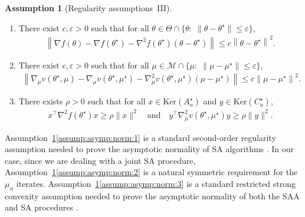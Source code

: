\documentclass[11pt,a4paper]{article}
\theoremstyle{definition}
\newtheorem{assumption}[theorem]{Assumption}
\begin{document}
\begin{assumption}[Regularity assumptions~III]~
\label{assump:asymp:norm}
\begin{enumerate}[label=(\roman*)]
    \item \label{assump:asymp:norm:1}  There exist $c,\varepsilon >0$ such that for all $\theta \in \Theta \cap \{\theta:\; \|\theta-\theta^\star\| \leq \varepsilon\}$,
    \begin{align*}
        \left\|\nabla {f}(\theta) -\nabla {f}(\theta^\star) - \nabla^2 {f}(\theta^\star) (\theta-\theta^\star)\right\| \leq c \left\|\theta-\theta^\star \right\|^2.
    \end{align*}

    \item \label{assump:asymp:norm:2} There exist $c,\varepsilon >0$ such that for all $\mu \in \mathcal M \cap \{\mu:\; \|\mu-\mu^\star\| \leq \varepsilon\}$,
    \begin{align*}
        \left\|\nabla_\mu v(\theta^\star,\mu) -\nabla_\mu v(\theta^\star,\mu^\star) - \nabla_\mu^2 v(\theta^\star,\mu^\star) (\mu-\mu^\star)\right\| \leq c \left\|\mu-\mu^\star \right\|^2.
    \end{align*}

    \item \label{assump:asymp:norm:3} There exists $\rho >0$ such that for all $x \in \text{Ker}(A^\star_a)$ and 
    $y \in \text{Ker}(C^\star_a)$,
    \begin{align*}
        x^\top \nabla^2 f(\theta^\star) x \geq \rho \|x\|^2 \quad \text{and} \quad y^\top \nabla_\mu^2 v(\theta^\star,\mu^\star) y \geq \rho \|y\|^2.
    \end{align*}
\end{enumerate}
\end{assumption}

Assumption~\ref{assump:asymp:norm}\ref{assump:asymp:norm:1} is a standard second-order regularity assumption needed to prove the asymptotic normality of SA algorithms \cite{polyak1992acceleration}. In our case, since we 
are dealing with a joint SA procedure, Assumption~\ref{assump:asymp:norm}\ref{assump:asymp:norm:2} is a natural symmetric requirement for the $\mu_n$ iterates. Assumption~\ref{assump:asymp:norm}\ref{assump:asymp:norm:3} is a standard restricted strong convexity assumption needed to prove the asymptotic normality of both the SAA and SA procedures \cite{shapiro1989asymptotic,duchi2021asymptotic}.
\end{document}
